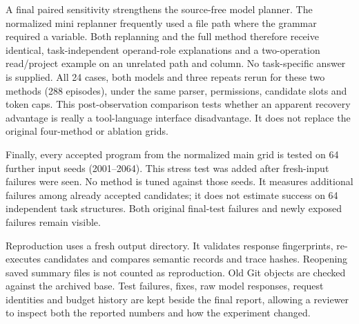 A final paired sensitivity strengthens the source-free model planner. The normalized mini replanner frequently used a file path where the grammar required a variable. Both replanning and the full method therefore receive identical, task-independent operand-role explanations and a two-operation read/project example on an unrelated path and column. No task-specific answer is supplied. All 24 cases, both models and three repeats rerun for these two methods (288 episodes), under the same parser, permissions, candidate slots and token caps. This post-observation comparison tests whether an apparent recovery advantage is really a tool-language interface disadvantage. It does not replace the original four-method or ablation grids.

Finally, every accepted program from the normalized main grid is tested on 64 further input seeds (2001--2064). This stress test was added after fresh-input failures were seen. No method is tuned against those seeds. It measures additional failures among already accepted candidates; it does not estimate success on 64 independent task structures. Both original final-test failures and newly exposed failures remain visible.

Reproduction uses a fresh output directory. It validates response fingerprints, re-executes candidates and compares semantic records and trace hashes. Reopening saved summary files is not counted as reproduction. Old Git objects are checked against the archived base. Test failures, fixes, raw model responses, request identities and budget history are kept beside the final report, allowing a reviewer to inspect both the reported numbers and how the experiment changed.
